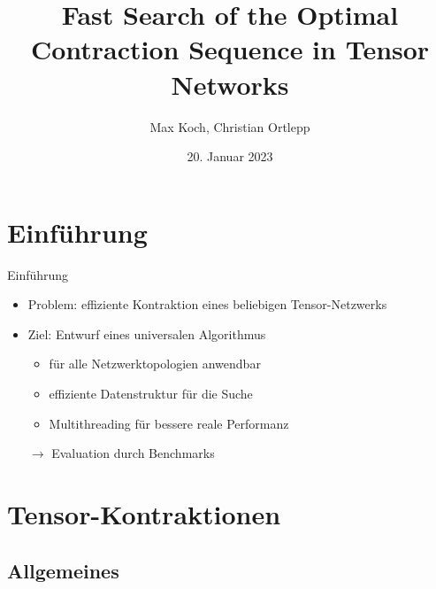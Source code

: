 \documentclass{beamer}
\title{Fast Search of the Optimal Contraction Sequence in Tensor Networks \cite{9325533}}
\author{Max Koch, Christian Ortlepp}
\institute{Friedrich-Schiller-Universität Jena}
\date{20. Januar 2023}
\begin{document}
\begin{frame}
	\titlepage
\end{frame}


\section{Einführung}

\begin{frame}{Einführung}
	\begin{itemize}
		\item Problem: effiziente Kontraktion eines beliebigen Tensor-Netzwerks
		\item Ziel: Entwurf eines universalen Algorithmus \begin{itemize}
				  \item für alle Netzwerktopologien anwendbar
			      \item effiziente Datenstruktur für die Suche
			      \item Multithreading für bessere reale Performanz
		      \end{itemize}
		\item[$\rightarrow$] Evaluation durch Benchmarks
	\end{itemize}
\end{frame}

\section{Tensor-Kontraktionen}
\subsection{Allgemeines}
\end{document}
